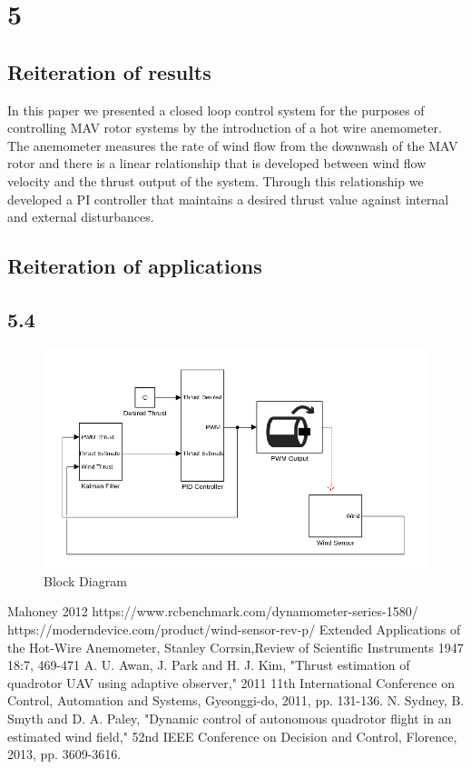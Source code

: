 \documentclass[conference]{IEEEtran}
\begin{document}
	\section{5}
	\subsection{Reiteration of results}
	In this paper we presented a closed loop control system for the purposes of controlling MAV rotor systems by the introduction of a hot wire anemometer. The anemometer measures the rate of wind flow from the downwash of the MAV rotor and there is a linear relationship that is developed between wind flow velocity and the thrust output of the system. Through this relationship we developed a PI controller that maintains a desired thrust value against internal and external disturbances.
	\subsection{Reiteration of applications}
	
	\subsection{}
	\subsection{5.4}
		\begin{figure}[b]
		\includegraphics[width=\textwidth / 2]{images/block_diagram.png}
		\caption{Block Diagram}
		\label{block_diagram}
	\end{figure}
	\begin{thebibliography}{99}
		 Mahoney 2012
		 https://www.rcbenchmark.com/dynamometer-series-1580/
		 https://moderndevice.com/product/wind-sensor-rev-p/
		 Extended Applications of the Hot‐Wire Anemometer, Stanley Corrsin,Review of Scientific Instruments 1947 18:7, 469-471 
		 A. U. Awan, J. Park and H. J. Kim, "Thrust estimation of quadrotor UAV using adaptive observer," 2011 11th International Conference on Control, Automation and Systems, Gyeonggi-do, 2011, pp. 131-136.
		 N. Sydney, B. Smyth and D. A. Paley, "Dynamic control of autonomous quadrotor flight in an estimated wind field," 52nd IEEE Conference on Decision and Control, Florence, 2013, pp. 3609-3616.

		
	\end{thebibliography}
\end{document}
